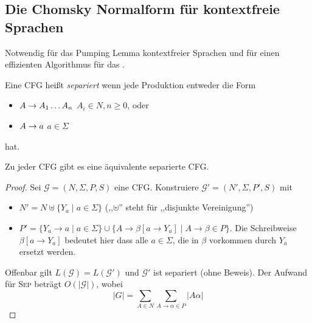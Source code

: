 \subsection{Die Chomsky Normalform für kontextfreie Sprachen}
Notwendig für das Pumping Lemma kontextfreier Sprachen und für einen effizienten Algorithmus für das .


\begin{Def}
  Eine CFG heißt \emph{separiert} wenn jede Produktion entweder die Form
  \begin{itemize}
  \item $A\-> A_1\dots A_n$ \qquad $A_i\in N,n\geq 0$, oder
  \item $A \-> a$ \quad $a\in\Sigma$
  \end{itemize}
  hat.
\end{Def}

\begin{lemma}
  Zu jeder CFG gibt es eine äquivalente separierte CFG.
\end{lemma}
\begin{proof}
  Sei $\mathcal{G} = (N, \Sigma, P, S)$ eine CFG.
  Konstruiere $\mathcal{G}' = (N', \Sigma, P', S)$ mit
  \begin{itemize}
  \item $N' = N \uplus \{Y_a \mid a \in \Sigma \}$ (,,$\uplus$'' steht für ,,disjunkte Vereinigung'')
  \item $P' = \{Y_a \to a \mid a \in \Sigma \} \cup \{A \to \beta[a \to Y_a] \mid A \to \beta \in P \}$.
    Die Schreibweise $\beta[a\to Y_a]$ bedeutet hier dass alle $a \in \Sigma$, die in $\beta$ vorkommen durch $Y_a$ ersetzt werden.
  \end{itemize}
Offenbar gilt $L(\mathcal{G}) = L(\mathcal{G'})$ und $\mathcal{G}'$ ist separiert (ohne Beweis).
Der Aufwand für \textsc{Sep} beträgt $O(|\mathcal{G}|)$, wobei 
\begin{displaymath}
  |G| = \sum_{A \in N}\sum_{A \to \alpha \in P} |A\alpha|
\end{displaymath}
\end{proof}


